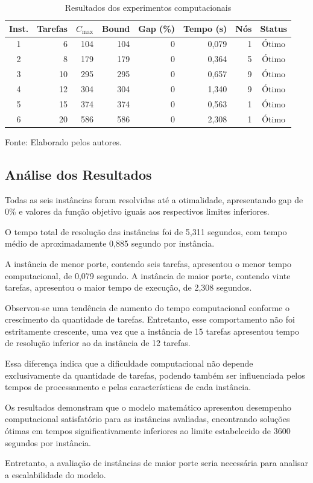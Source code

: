 \begin{table}[htbp]
\centering
\caption{Resultados dos experimentos computacionais}
\label{tab:resultados_computacionais}
\small
\begin{tabular}{crrrrrrc}
\hline
Inst. & Tarefas & $C_{\max}$ & Bound & Gap (\%) & Tempo (s) & Nós & Status \\
\hline
1 & 6  & 104 & 104 & 0 & 0,079 & 1 & Ótimo \\
2 & 8  & 179 & 179 & 0 & 0,364 & 5 & Ótimo \\
3 & 10 & 295 & 295 & 0 & 0,657 & 9 & Ótimo \\
4 & 12 & 304 & 304 & 0 & 1,340 & 9 & Ótimo \\
5 & 15 & 374 & 374 & 0 & 0,563 & 1 & Ótimo \\
6 & 20 & 586 & 586 & 0 & 2,308 & 1 & Ótimo \\
\hline
\end{tabular}

\smallskip
\small Fonte: Elaborado pelos autores.
\end{table}

\subsection{Análise dos Resultados}

Todas as seis instâncias foram resolvidas até a otimalidade, apresentando gap de 0\% e valores da função objetivo iguais aos respectivos limites inferiores.

O tempo total de resolução das instâncias foi de 5,311 segundos, com tempo médio de aproximadamente 0,885 segundo por instância.

A instância de menor porte, contendo seis tarefas, apresentou o menor tempo computacional, de 0,079 segundo. A instância de maior porte, contendo vinte tarefas, apresentou o maior tempo de execução, de 2,308 segundos.

Observou-se uma tendência de aumento do tempo computacional conforme o crescimento da quantidade de tarefas. Entretanto, esse comportamento não foi estritamente crescente, uma vez que a instância de 15 tarefas apresentou tempo de resolução inferior ao da instância de 12 tarefas.

Essa diferença indica que a dificuldade computacional não depende exclusivamente da quantidade de tarefas, podendo também ser influenciada pelos tempos de processamento e pelas características de cada instância.

Os resultados demonstram que o modelo matemático apresentou desempenho computacional satisfatório para as instâncias avaliadas, encontrando soluções ótimas em tempos significativamente inferiores ao limite estabelecido de 3600 segundos por instância.

Entretanto, a avaliação de instâncias de maior porte seria necessária para analisar a escalabilidade do modelo.